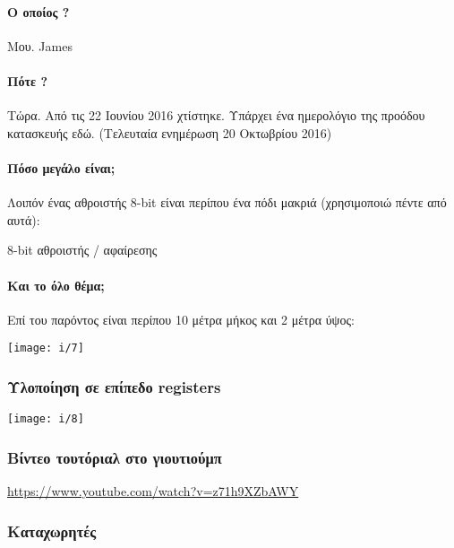 \documentclass[11pt,a4paper,notitlepage,fleqn]{article}
\begin{document}
\paragraph{Ο οποίος ?} Μου. James


\paragraph{Πότε ?} Τώρα. Από τις 22 Ιουνίου 2016 χτίστηκε. Υπάρχει ένα ημερολόγιο της προόδου κατασκευής εδώ. (Τελευταία ενημέρωση 20 Οκτωβρίου 2016)


\paragraph{Πόσο μεγάλο είναι;} Λοιπόν ένας αθροιστής 8-bit είναι περίπου ένα πόδι μακριά (χρησιμοποιώ πέντε από αυτά):

8-bit αθροιστής / αφαίρεσης

\paragraph{Και το όλο θέμα;} Επί του παρόντος είναι περίπου 10 μέτρα μήκος και 2 μέτρα ύψος:

{\centering\texttt{[image: i/7]}}

\subsubsection{Υλοποίηση σε επίπεδο registers}
\texttt{[image: i/8]}

\subsubsection{Βίντεο τουτόριαλ στο γιουτιούμπ}
{\Large\url{https://www.youtube.com/watch?v=z71h9XZbAWY}}

\subsubsection{Καταχωρητές}
\end{document}
